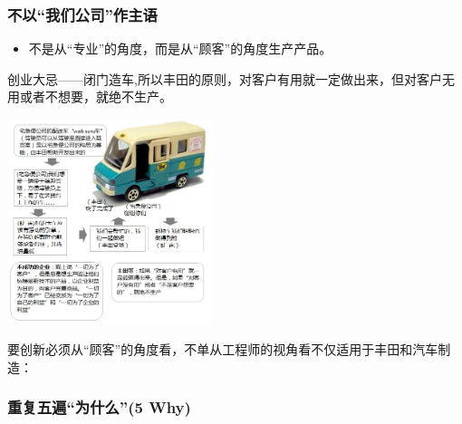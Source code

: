 \hypertarget{ux4e0dux4ee5ux6211ux4eecux516cux53f8ux4f5cux4e3bux8bed}{%
\subsubsection{不以``我们公司''作主语}\label{ux4e0dux4ee5ux6211ux4eecux516cux53f8ux4f5cux4e3bux8bed}}

\begin{itemize}
\tightlist
\item
  不是从``专业''的角度，而是从``顾客''的角度生产产品。
\end{itemize}

\begin{description}
\tightlist
\item[]
创业大忌------闭门造车,所以丰田的原则，对客户有用就一定做出来，但对客户无用或者不想要，就绝不生产。\\
\end{description}


\includegraphics[width=6cm]{丰田p3-1.jpg}

要创新必须从``顾客''的角度看，不单从工程师的视角看不仅适用于丰田和汽车制造：


\hypertarget{ux91cdux590dux4e94ux904dux4e3aux4ec0ux4e485-why}{%
\subsubsection{重复五遍``为什么''(5
Why)}\label{ux91cdux590dux4e94ux904dux4e3aux4ec0ux4e485-why}}

